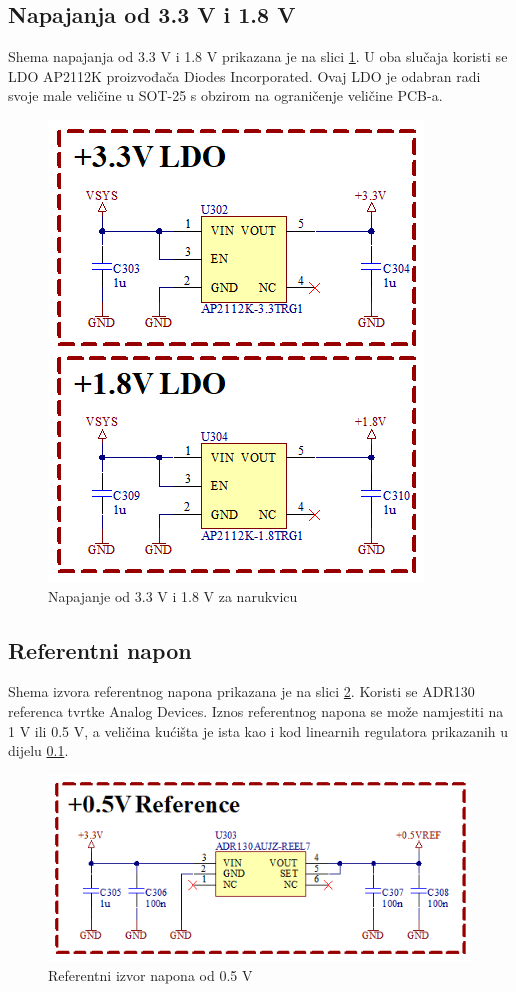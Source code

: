 \subsection{Napajanja od 3.3 V i 1.8 V}
\label{subsec:BR_VDD}
Shema napajanja od 3.3 V i 1.8 V prikazana je na slici \ref{slk:BR_VDD}. U oba slučaja koristi se LDO AP2112K proizvođača Diodes Incorporated. Ovaj LDO je odabran radi svoje male veličine u SOT-25 s obzirom na ograničenje veličine PCB-a. 
\begin{figure}[htb]
    \centering
    \includegraphics[width=6 cm]{Figures/BR_VDD.png}
    \caption{Napajanje od 3.3 V i 1.8 V za narukvicu}
    \label{slk:BR_VDD}
\end{figure}

\subsection{Referentni napon}

Shema izvora referentnog napona prikazana je na slici \ref{slk:BR_VREF}. Koristi se ADR130 referenca tvrtke Analog Devices. Iznos referentnog napona se može namjestiti na 1 V ili 0.5 V, a veličina kućišta je ista kao i kod linearnih regulatora prikazanih u dijelu \ref{subsec:BR_VDD}.
\begin{figure}[htb]
    \centering
    \includegraphics[width=10 cm]{Figures/BR_VREF.png}
    \caption{Referentni izvor napona od 0.5 V}
    \label{slk:BR_VREF}
\end{figure}

